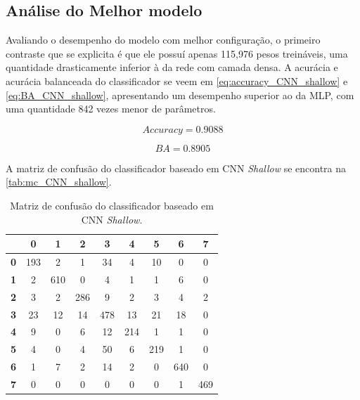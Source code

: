 \subsection{Análise do Melhor modelo}

	Avaliando o desempenho do modelo com melhor configuração, o primeiro contraste que se explicita é que ele possuí apenas 115,976 pesos treináveis, uma quantidade drasticamente inferior à da rede com camada densa. A acurácia e acurácia balanceada do classificador se veem em \eqref{eq:accuracy_CNN_shallow} e \eqref{eq:BA_CNN_shallow}, apresentando um desempenho superior ao da MLP, com uma quantidade 842 vezes menor de parâmetros.

\begin{equation}\label{eq:accuracy_CNN_shallow}
	Accuracy = 0.9088
\end{equation}

\begin{equation}\label{eq:BA_CNN_shallow}
	BA = 0.8905
\end{equation}

A matriz de confusão do classificador baseado em CNN \textit{Shallow} se encontra na \autoref{tab:mc_CNN_shallow}.

\begin{table}[H]
	\centering
	\begin{tabular}{c||c|c|c|c|c|c|c|c|}
		\cline{2-9}
		\textbf{}                        & \textbf{0} & \textbf{1} & \textbf{2} & \textbf{3} & \textbf{4} & \textbf{5} & \textbf{6} & \textbf{7} \\ \hline \hline
		\multicolumn{1}{|c||}{\textbf{0}} & 193        & 2          & 1          & 34         & 4          & 10         & 0          & 0          \\ \hline
		\multicolumn{1}{|c||}{\textbf{1}} & 2          & 610        & 0          & 4          & 1          & 1          & 6          & 0          \\ \hline
		\multicolumn{1}{|c||}{\textbf{2}} & 3          & 2          & 286        & 9          & 2          & 3          & 4          & 2          \\ \hline
		\multicolumn{1}{|c||}{\textbf{3}} & 23         & 12         & 14         & 478        & 13         & 21         & 18         & 0          \\ \hline
		\multicolumn{1}{|c||}{\textbf{4}} & 9          & 0          & 6          & 12         & 214        & 1          & 1          & 0          \\ \hline
		\multicolumn{1}{|c||}{\textbf{5}} & 4          & 0          & 4          & 50         & 6          & 219        & 1          & 0          \\ \hline
		\multicolumn{1}{|c||}{\textbf{6}} & 1          & 7          & 2          & 14         & 2          & 0          & 640        & 0          \\ \hline
		\multicolumn{1}{|c||}{\textbf{7}} & 0          & 0          & 0          & 0          & 0          & 0          & 1          & 469        \\ \hline
	\end{tabular}
	\caption{Matriz de confusão do classificador baseado em CNN \textit{Shallow}.}
	\label{tab:mc_CNN_shallow}
\end{table}


